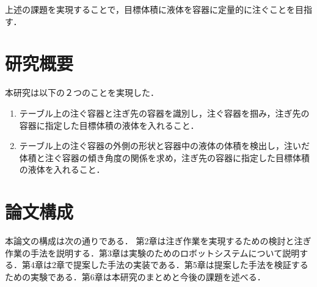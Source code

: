 上述の課題を実現することで，目標体積に液体を容器に定量的に注ぐことを目指す．

\section{研究概要}
本研究は以下の２つのことを実現した．
\begin{enumerate}
	\item テーブル上の注ぐ容器と注ぎ先の容器を識別し，注ぐ容器を掴み，注ぎ先の容器に指定した目標体積の液体を入れること．
	\item テーブル上の注ぐ容器の外側の形状と容器中の液体の体積を検出し，注いだ体積と注ぐ容器の傾き角度の関係を求め，注ぎ先の容器に指定した目標体積の液体を入れること．
\end{enumerate}
		
\section{論文構成}
本論文の構成は次の通りである．
第2章は注ぎ作業を実現するための検討と注ぎ作業の手法を説明する．第3章は実験のためのロボットシステムについて説明する．第4章は2章で提案した手法の実装である．第5章は提案した手法を検証するための実験である．第6章は本研究のまとめと今後の課題を述べる．
	
	
	
	
	